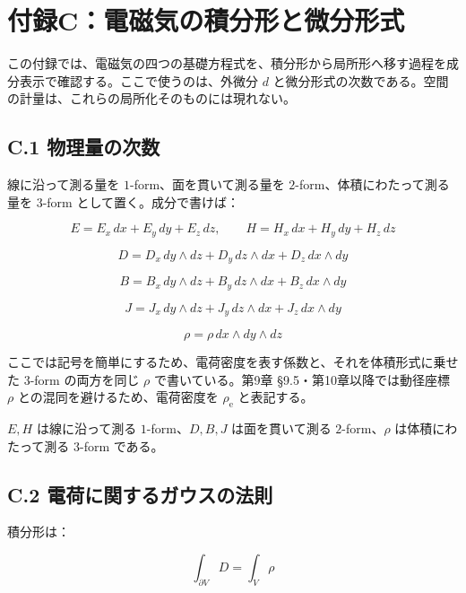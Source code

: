\documentclass[a4paper,12pt,openany]{book}
\begin{document}
\hypertarget{ux4ed8ux9332cux96fbux78c1ux6c17ux306eux7a4dux5206ux5f62ux3068ux5faeux5206ux5f62ux5f0f}{%
\section{付録C：電磁気の積分形と微分形式}\label{ux4ed8ux9332cux96fbux78c1ux6c17ux306eux7a4dux5206ux5f62ux3068ux5faeux5206ux5f62ux5f0f}}

この付録では、電磁気の四つの基礎方程式を、積分形から局所形へ移す過程を成分表示で確認する。ここで使うのは、外微分
\(d\)
と微分形式の次数である。空間の計量は、これらの局所化そのものには現れない。

\hypertarget{c.1-ux7269ux7406ux91cfux306eux6b21ux6570}{%
\subsection*{C.1
物理量の次数}\label{c.1-ux7269ux7406ux91cfux306eux6b21ux6570}}

線に沿って測る量を \(1\)-form、面を貫いて測る量を
\(2\)-form、体積にわたって測る量を \(3\)-form として置く。成分で書けば：

\[
E = E_x\,dx+E_y\,dy+E_z\,dz,
\qquad
H = H_x\,dx+H_y\,dy+H_z\,dz
\]

\[D = D_x\,dy\wedge dz + D_y\,dz\wedge dx + D_z\,dx\wedge dy\]

\[B = B_x\,dy\wedge dz + B_y\,dz\wedge dx + B_z\,dx\wedge dy\]

\[J = J_x\,dy\wedge dz + J_y\,dz\wedge dx + J_z\,dx\wedge dy\]

\[
\rho = \rho\,dx\wedge dy\wedge dz
\]

ここでは記号を簡単にするため、電荷密度を表す係数と、それを体積形式に乗せた
\(3\)-form の両方を同じ \(\rho\) で書いている。第9章
§9.5・第10章以降では動径座標 \(\rho\) との混同を避けるため、電荷密度を
\(\rho_{\mathrm e}\) と表記する。

\(E,H\) は線に沿って測る \(1\)-form、\(D,B,J\) は面を貫いて測る
\(2\)-form、\(\rho\) は体積にわたって測る \(3\)-form である。

\hypertarget{c.2-ux96fbux8377ux306bux95a2ux3059ux308bux30acux30a6ux30b9ux306eux6cd5ux5247}{%
\subsection*{C.2
電荷に関するガウスの法則}\label{c.2-ux96fbux8377ux306bux95a2ux3059ux308bux30acux30a6ux30b9ux306eux6cd5ux5247}}

積分形は：

\[
\int_{\partial V}D=\int_V\rho
\]
\end{document}
